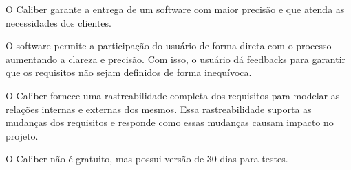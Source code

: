 O Caliber garante a entrega de um software com maior precisão e que atenda as necessidades dos clientes.

O software permite a participação do usuário de forma direta com o processo aumentando a clareza e precisão. Com isso, o usuário dá feedbacks para garantir que os requisitos não sejam definidos de forma inequívoca.

O Caliber fornece uma rastreabilidade completa dos requisitos para modelar as relações internas e externas dos mesmos.  Essa rastreabilidade suporta as mudanças dos requisitos  e responde como essas mudanças causam impacto no projeto.

O Caliber não é gratuito, mas possui versão de 30 dias para testes.
